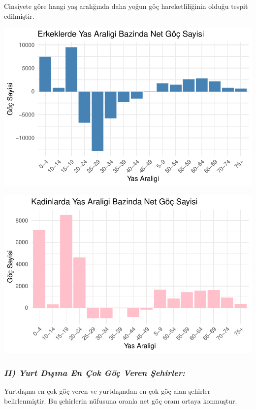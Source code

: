 \documentclass[
  11pt,
  a4paper,
  DIV=11,
  numbers=noendperiod]{scrartcl}
\begin{document}
Cinsiyete göre hangi yaş aralığında daha yoğun göç hareketliliğinin
olduğu tespit edilmiştir.

\includegraphics{project_files/figure-pdf/unnamed-chunk-2-1.pdf}

\includegraphics{project_files/figure-pdf/unnamed-chunk-3-1.pdf}

\subsubsection{\texorpdfstring{\emph{II) Yurt Dışına En Çok Göç Veren
Şehirler:}}{II) Yurt Dışına En Çok Göç Veren Şehirler:}}\label{ii-yurt-dux131ux15fux131na-en-uxe7ok-guxf6uxe7-veren-ux15fehirler}

Yurtdışına en çok göç veren ve yurtdışından en çok göç alan şehirler
belirlenmiştir. Bu şehirlerin nüfusuna oranla net göç oranı ortaya
konmuştur.
\end{document}
